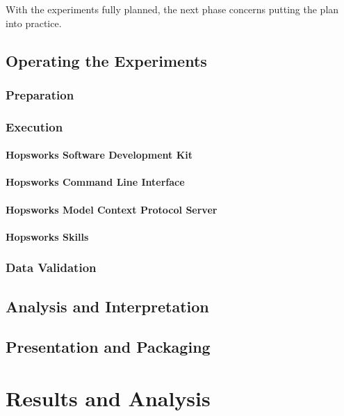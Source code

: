 \documentclass[
english,                 %
bibtex,                  %
includeExtraAbstracts, %
]{kththesis}
\numberwithin{listing}{chapter}
\begin{document}
With the experiments fully planned, the next phase concerns putting the plan into practice.

\section{Operating the Experiments}

\subsection{Preparation}

\subsection{Execution}

\subsubsection{Hopsworks Software Development Kit}
\subsubsection{Hopsworks Command Line Interface}
\subsubsection{Hopsworks Model Context Protocol Server}
\subsubsection{Hopsworks Skills}

\subsection{Data Validation}

\section{Analysis and Interpretation}

\section{Presentation and Packaging}

\cleardoublepage

\chapter{Results and Analysis}
\end{document}

